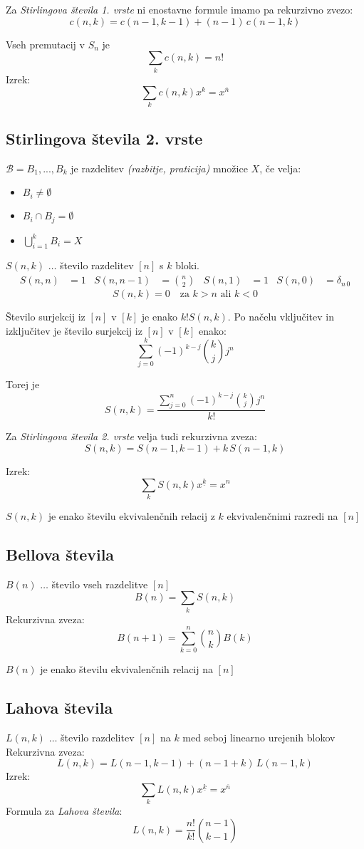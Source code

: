 \documentclass[11pt,a4paper]{article}
\begin{document}
Za \emph{Stirlingova števila 1. vrste} ni enostavne formule imamo pa rekurzivno zvezo:
\[c(n,k) = c(n-1,k-1) + (n-1)\, c(n-1,k)\]

Vseh premutacij v $S_n$ je
\[\sum_k c(n,k) = n!\]
Izrek:
\[\sum_k c(n,k)x^k = x^{\overline{n}} \]

\subsection*{Stirlingova števila 2. vrste}
$\mathcal{B} = {B_1, ..., B_k}$ je razdelitev \textit{(razbitje, praticija)} množice $X$, če velja:
\begin{itemize}
    \item $B_i \neq \emptyset$
    \item $B_i \cap B_j = \emptyset$
    \item $\bigcup_{i=1}^k B_i = X$
\end{itemize}


$S(n,k)$ $\dots$ število razdelitev $[n]$ s $k$ bloki. 
\begin{align*}
    S(n,n) &= 1 & S(n,n-1) &= \binom{n}{2} & S(n,1) &= 1 & S(n,0) &= \delta_{n\,0}
\end{align*}
\[S(n,k) = 0 \quad \text{za $k>n$ ali $k<0$}\]

Število surjekcij iz $[n]$ v $[k]$ je enako $k! S(n,k)$.
Po načelu vključitev in izključitev je število surjekcij iz $[n]$ v $[k]$ enako:
\[\sum_{j=0}^k (-1)^{k-j} \binom{k}{j} j^n\]

Torej je
\[S(n,k)=\frac{\sum_{j=0}^n (-1)^{k-j}\binom{k}{j}j^n}{k!} \]

Za \emph{Stirlingova števila 2. vrste} velja tudi rekurzivna zveza:
\[S(n,k) = S(n-1,k-1) + k\,S(n-1,k)\]

Izrek:
\[ \sum_k S(n,k)x^{\underline{k}} = x^n\]

$S(n,k)$ je enako številu ekvivalenčnih relacij z $k$ ekvivalenčnimi razredi na $[n]$

\subsection*{Bellova števila}
$B(n)$ $\dots$ število vseh razdelitve $[n]$
\[B(n) = \sum_k S(n,k)\]
Rekurzivna zveza:
\[B(n+1) = \sum_{k=0}^n \binom{n}{k} B(k)\]

$B(n)$ je enako številu ekvivalenčnih relacij na $[n]$

\subsection*{Lahova števila}
$L(n,k)$ $\dots$ število razdelitev $[n]$ na $k$ med seboj linearno urejenih blokov
Rekurzivna zveza:
\[L(n,k) = L(n-1,k-1) + (n-1+k)\,L(n-1,k)\]
Izrek:
\[\sum_k L(n,k)x^{\underline{k}} = x^{\overline{n}}\]
Formula za \emph{Lahova števila}:
\[L(n,k) = \frac{n!}{k!}\binom{n-1}{k-1}\]
\end{document}
